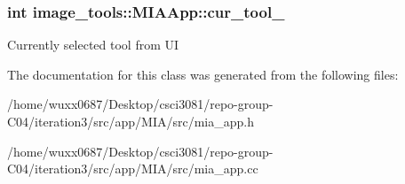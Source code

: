 \subsubsection[{\texorpdfstring{cur\+\_\+tool\+\_\+}{cur_tool_}}]{\setlength{\rightskip}{0pt plus 5cm}int image\+\_\+tools\+::\+M\+I\+A\+App\+::cur\+\_\+tool\+\_\+\hspace{0.3cm}{\ttfamily [private]}}\hypertarget{classimage__tools_1_1MIAApp_a5f86ffd9e81a59a12ff54bb7641addda}{}\label{classimage__tools_1_1MIAApp_a5f86ffd9e81a59a12ff54bb7641addda}
Currently selected tool from UI 

The documentation for this class was generated from the following files\+:\begin{DoxyCompactItemize}
\item 
/home/wuxx0687/\+Desktop/csci3081/repo-\/group-\/\+C04/iteration3/src/app/\+M\+I\+A/src/mia\+\_\+app.\+h\item 
/home/wuxx0687/\+Desktop/csci3081/repo-\/group-\/\+C04/iteration3/src/app/\+M\+I\+A/src/mia\+\_\+app.\+cc\end{DoxyCompactItemize}
